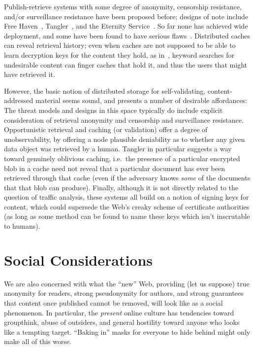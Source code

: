 \documentclass[oneside]{zarticle}
\begin{document}
\begin{multicols}{2}
Publish-retrieve systems with some degree of anonymity, censorship
resistance, and/or surveillance resistance have been proposed before;
designs of note include Free Haven~\cite{dingledine2000freehaven},
Tangler~\cite{waldman2001tangler}, and the Eternity
Service~\cite{anderson1996eternity, benes2001strongeternity}. So far
none has achieved wide deployment, and some have been found to have
serious flaws~\cite{kugler2003gnunet}.  Distributed caches can reveal
retrieval history; even when caches are not supposed to be able to
learn decryption keys for the content they hold, as
in~\textcite{serjantov2002anonymizing}, keyword searches for
undesirable content can finger caches that hold it, and thus the users
that might have retrieved it.

However, the basic notion of distributed storage for self-validating,
content-addressed material seems sound, and presents a number of
desirable affordances: The threat models and designs in this space
typically do include explicit consideration of retrieval anonymity and
censorship and surveillance resistance.  Opportunistic retrieval and
caching (or validation) offer a degree of unobservability, by offering
a node plausible deniability as to whether any given data object was
retrieved by a human.  Tangler in particular suggests a way toward
genuinely oblivious caching, i.e.\ the presence of a particular
encrypted blob in a cache need not reveal that a particular document
has ever been retrieved through that cache (even if the adversary
knows \emph{some} of the documents that that blob can produce).
Finally, although it is not directly related to the question of
traffic analysis, these systems all build on a notion of signing keys
for content, which could supersede the Web's creaky scheme of
certificate authorities (as long as some method can be found to
name these keys which isn't inscrutable to humans).

\section{Social Considerations}

We are also concerned with what the “new” Web, providing (let us
suppose) true anonymity for readers, strong pseudonymity for authors,
and strong guarantees that content once published cannot be removed,
will look like as a social phenomenon.  In particular, the
\emph{present} online culture has tendencies toward groupthink, abuse
of outsiders, and general hostility toward anyone who looks like a
tempting target. “Baking in” masks for everyone to hide behind might
only make all of this worse.


\end{multicols}
\end{document}
